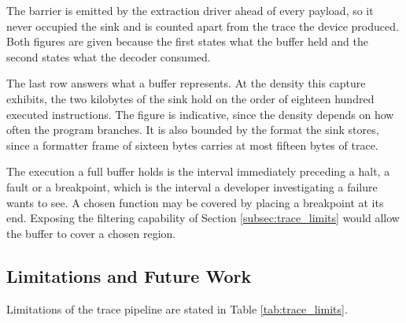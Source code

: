 The barrier is emitted by the extraction driver ahead of every payload, so it never occupied the sink and is counted apart from the trace the device produced. Both figures are given because the first states what the buffer held and the second states what the decoder consumed.

The last row answers what a buffer represents. At the density this capture exhibits, the two kilobytes of the sink hold on the order of eighteen hundred executed instructions. The figure is indicative, since the density depends on how often the program branches. It is also bounded by the format the sink stores, since a formatter frame of sixteen bytes carries at most fifteen bytes of trace.

The execution a full buffer holds is the interval immediately preceding a halt, a fault or a breakpoint, which is the interval a developer investigating a failure wants to see. A chosen function may be covered by placing a breakpoint at its end. Exposing the filtering capability of Section \ref{subsec:trace_limits} would allow the buffer to cover a chosen region.

\subsection{Limitations and Future Work}
\label{subsec:limits}
\label{subsec:trace_limits}
Limitations of the trace pipeline are stated in Table \ref{tab:trace_limits}.

